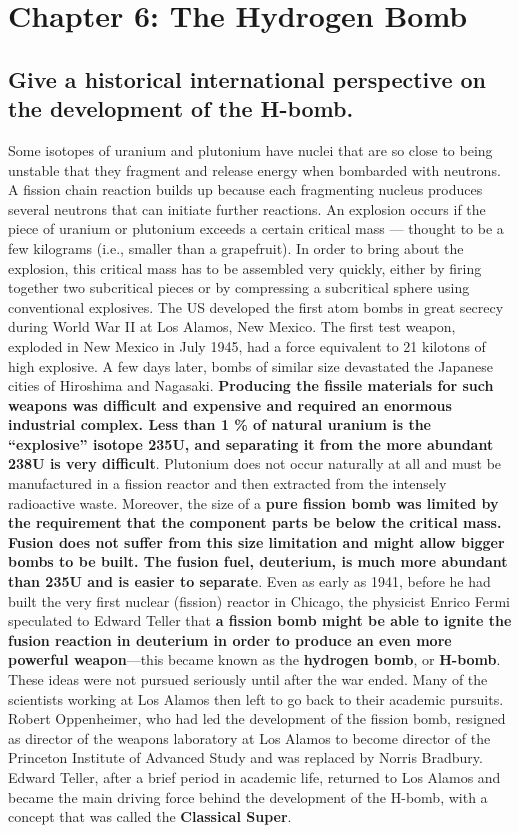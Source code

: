 \section{Chapter 6: The Hydrogen Bomb}

\subsection{Give a historical international perspective on the development of the H-bomb.}
\begin{multisolutionblock}
Some isotopes of uranium and plutonium have nuclei that are so close to being unstable that they fragment and release energy when bombarded with neutrons. A fission chain reaction builds up because each fragmenting nucleus produces several neutrons that can initiate further reactions. An explosion occurs if the piece of uranium or plutonium exceeds a certain critical mass — thought to be a few kilograms (i.e., smaller than a grapefruit). In order to bring about the explosion, this critical mass has to be assembled very quickly, either by firing together two subcritical pieces or by compressing a subcritical sphere
using conventional explosives. The US developed the first atom bombs in
great secrecy during World War II at Los Alamos, New Mexico. The first test weapon, exploded in New Mexico in July 1945, had a force equivalent to 21 kilotons of high explosive. A few days later, bombs of similar size devastated the Japanese cities of Hiroshima and Nagasaki.
\textbf{Producing the fissile materials for such weapons was difficult and expensive and required an enormous industrial complex. Less than 1 \% of natural uranium is the “explosive” isotope 235U, and separating it from the more abundant 238U is very difficult}. Plutonium does not occur naturally at all and must be manufactured in a fission reactor and then extracted from the intensely radioactive waste. Moreover, the size of a \textbf{pure fission bomb was limited by the requirement that the component parts be below the critical mass. Fusion does not suffer from this size limitation and might allow bigger bombs to be built. The fusion fuel, deuterium, is much more abundant than 235U and is easier to separate}.
Even as early as 1941, before he had built the very first nuclear (fission) reactor in Chicago, the physicist Enrico Fermi speculated to Edward Teller that \textbf{a fission bomb might be able to ignite the fusion reaction in deuterium in order to produce an even more powerful weapon}—this became known as the \textbf{hydrogen bomb}, or \textbf{H-bomb}. These ideas were not pursued seriously until after the war ended. Many of the scientists working at Los Alamos then left to go
back to their academic pursuits. Robert Oppenheimer, who had led the development of the fission bomb, resigned as director of the weapons laboratory at Los Alamos to become director of the Princeton Institute of Advanced Study and was replaced by Norris Bradbury. Edward Teller, after a brief period in academic life, returned to Los Alamos and became the main driving force behind the development of the H-bomb, with a concept that was called the \textbf{Classical Super}.


\end{multisolutionblock}
